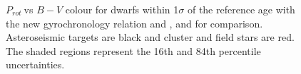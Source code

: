 \documentclass[useAMS, usenatbib]{mn2e}
\newcommand{\prot}{$P_{rot}~$}
\begin{document}
\begin{figure}
\begin{center}
{        }
    \end{center}
    \caption{ \prot vs $B-V$ colour for dwarfs within 1$\sigma$ of the
reference age with the new gyrochronology relation and \citet{Barnes2007}, and
\citet{Mamajek2008} for comparison. Asteroseismic targets are black and
cluster and field stars are red. The shaded regions represent the 16th and
84th percentile uncertainties.  \label{fig:subfigures2}}
\end{figure}
\end{document}
